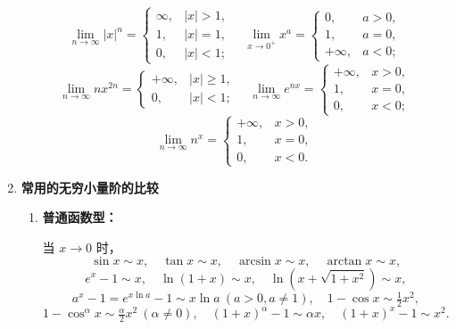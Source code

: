 \begin{enumerate}
          \[
              \lim_{n\to\infty}|x|^n=
              \begin{cases}
                  \infty, & |x|>1, \\
                  1,      & |x|=1, \\
                  0,      & |x|<1;
              \end{cases}
              \quad
              \lim_{x\to0^+}x^a=
              \begin{cases}
                  0,       & a>0, \\
                  1,       & a=0, \\
                  +\infty, & a<0;
              \end{cases}
          \]
          \[
              \lim_{n\to\infty}nx^{2n}=
              \begin{cases}
                  +\infty, & |x|\ge1, \\
                  0,       & |x|<1;
              \end{cases}
              \quad
              \lim_{n\to\infty}e^{nx}=
              \begin{cases}
                  +\infty, & x>0, \\
                  1,       & x=0, \\
                  0,       & x<0;
              \end{cases}
          \]
          \[
              \lim_{n\to\infty}n^x=
              \begin{cases}
                  +\infty, & x>0, \\
                  1,       & x=0, \\
                  0,       & x<0.
              \end{cases}
          \]

    \item \textbf{常用的无穷小量阶的比较}

          \begin{enumerate}
              \item \textbf{普通函数型：}

                    当 $x\to0$ 时，
                    \[
                        \sin x \sim x, \quad \tan x \sim x, \quad
                        \arcsin x \sim x, \quad \arctan x \sim x,
                    \]
                    \[
                        e^x - 1 \sim x, \quad \ln(1+x) \sim x, \quad
                        \ln(x + \sqrt{1+x^2}) \sim x,
                    \]
                    \[
                        a^x - 1 = e^{x\ln a}-1 \sim x\ln a \ (a>0,a\ne1),
                        \quad 1 - \cos x \sim \tfrac{1}{2}x^2,
                    \]
                    \[
                        1 - \cos^{\alpha}x \sim \tfrac{\alpha}{2}x^2 \ (\alpha\ne0),
                        \quad (1+x)^{\alpha}-1 \sim \alpha x,
                        \quad (1+x)^x - 1 \sim x^2.
                    \]


\end{enumerate}
\end{enumerate}
